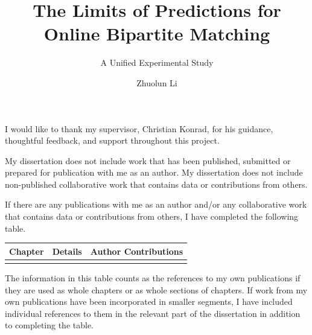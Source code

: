 \documentclass[
  bibstyle=acmnumeric,   %
  twoside=false,         %
]{uob-thesis}
\title{The Limits of Predictions for Online Bipartite Matching}
\subtitle{A Unified Experimental Study}
\author{Zhuolun Li}
\date{\printdatewithoutmonth{thesisdate}}
\renewcommand*{\cleardoubleoddemptypage}{\clearpage}
\begin{document}
\hypersetup{pageanchor=false}
\maketitle
\cleardoubleoddemptypage

\begin{abstract}
\end{abstract}

\begin{acknowledgements}
I would like to thank my supervisor, Christian Konrad, for his guidance,
thoughtful feedback, and support throughout this project.
\end{acknowledgements}

\begin{statement}
My dissertation does not include work that has been published, submitted or prepared for publication with me as an author.
My dissertation does not include non-published collaborative work that contains data or contributions from others.

If there are any publications with me as an author and/or any collaborative work that contains data or contributions from others, I have completed the following table.

\begin{table}[h!]
\centering
\begin{tabular}{|l|l|l|}
\hline
\textbf{Chapter} & \textbf{Details} & \textbf{Author Contributions}  \\ \hline
                 &                  &                                \\ \hline
\end{tabular}
\end{table}

The information in this table counts as the references to my own publications if they are used as whole chapters or as whole sections of chapters. If work from my own publications have been incorporated in smaller segments, I have included individual references to them in the relevant part of the dissertation in addition to completing the table.
\end{statement}
\end{document}
